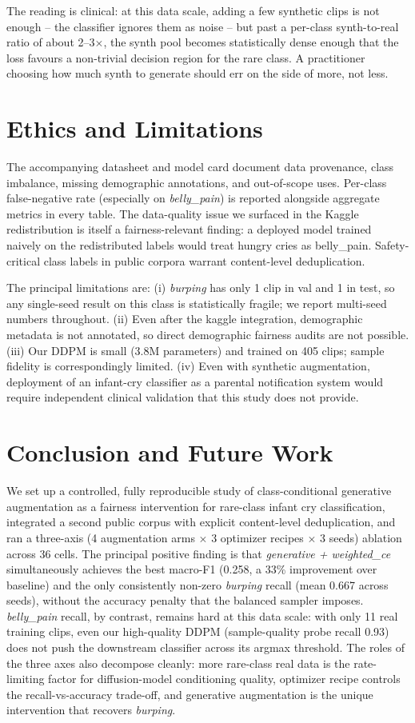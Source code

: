 \documentclass[final]{article}
\begin{document}
The reading is clinical: at this data scale, adding a few synthetic clips is not enough -- the classifier ignores them as noise -- but past a per-class synth-to-real ratio of about 2--3$\times$, the synth pool becomes statistically dense enough that the loss favours a non-trivial decision region for the rare class. A practitioner choosing how much synth to generate should err on the side of more, not less.

\section{Ethics and Limitations}\label{sec:ethicslim}
The accompanying datasheet and model card document data provenance, class imbalance, missing demographic annotations, and out-of-scope uses. Per-class false-negative rate (especially on \textit{belly\_pain}) is reported alongside aggregate metrics in every table. The data-quality issue we surfaced in the Kaggle redistribution is itself a fairness-relevant finding: a deployed model trained naively on the redistributed labels would treat hungry cries as belly\_pain. Safety-critical class labels in public corpora warrant content-level deduplication.

The principal limitations are: (i) \textit{burping} has only 1 clip in val and 1 in test, so any single-seed result on this class is statistically fragile; we report multi-seed numbers throughout. (ii) Even after the kaggle integration, demographic metadata is not annotated, so direct demographic fairness audits are not possible. (iii) Our DDPM is small (3.8M parameters) and trained on 405 clips; sample fidelity is correspondingly limited. (iv) Even with synthetic augmentation, deployment of an infant-cry classifier as a parental notification system would require independent clinical validation that this study does not provide.

\section{Conclusion and Future Work}\label{sec:concl}
We set up a controlled, fully reproducible study of class-conditional generative augmentation as a fairness intervention for rare-class infant cry classification, integrated a second public corpus with explicit content-level deduplication, and ran a three-axis (4 augmentation arms $\times$ 3 optimizer recipes $\times$ 3 seeds) ablation across 36 cells. The principal positive finding is that \textit{generative + weighted\_ce} simultaneously achieves the best macro-F1 (0.258, a 33\% improvement over baseline) and the only consistently non-zero \textit{burping} recall (mean 0.667 across seeds), without the accuracy penalty that the balanced sampler imposes. \textit{belly\_pain} recall, by contrast, remains hard at this data scale: with only 11 real training clips, even our high-quality DDPM (sample-quality probe recall 0.93) does not push the downstream classifier across its argmax threshold. The roles of the three axes also decompose cleanly: more rare-class real data is the rate-limiting factor for diffusion-model conditioning quality, optimizer recipe controls the recall-vs-accuracy trade-off, and generative augmentation is the unique intervention that recovers \textit{burping}.
\end{document}
